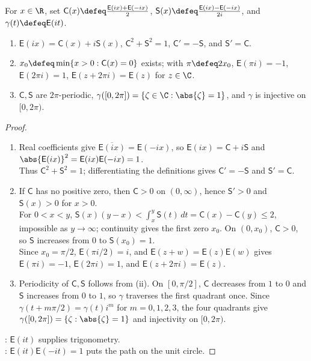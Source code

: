 \begin{theorem} \label{thm:trigonometric-functions-from-exponential} \\
For $x\in\R$, set $\mathsf{C}(x)\defeq\frac{\mathsf{E}(ix)+\mathsf{E}(-ix)}{2}$, $\mathsf{S}(x)\defeq\frac{\mathsf{E}(ix)-\mathsf{E}(-ix)}{2i}$, and $\gamma(t)\defeq\mathsf{E}(it)$.
\begin{enumerate}[label=(\roman*)]
\setlength{\itemsep}{0pt}
\item $\mathsf{E}(ix)=\mathsf{C}(x)+i\mathsf{S}(x)$, $\mathsf{C}^2+\mathsf{S}^2=1$, $\mathsf{C}'=-\mathsf{S}$, and $\mathsf{S}'=\mathsf{C}$.
\item $x_0\defeq\min\{x>0:\mathsf{C}(x)=0\}$ exists; with $\pi\defeq2x_0$, $\mathsf{E}(\pi i)=-1$, $\mathsf{E}(2\pi i)=1$, $\mathsf{E}(z+2\pi i)=\mathsf{E}(z)$ for $z\in\C$.
\item $\mathsf{C},\mathsf{S}$ are $2\pi$-periodic, $\gamma([0,2\pi])=\{\zeta\in\C:\abs{\zeta}=1\}$, and $\gamma$ is injective on $[0,2\pi)$.
\end{enumerate}
\begin{proof}
\begin{enumerate}[label=(\roman*)]
\setlength{\itemsep}{0pt}
\item Real coefficients give $\overline{\mathsf{E}(ix)}=\mathsf{E}(-ix)$, so $\mathsf{E}(ix)=\mathsf{C}+i\mathsf{S}$ and $\abs{\mathsf{E}(ix)}^2=\mathsf{E}(ix)\mathsf{E}(-ix)=1$.\\
Thus $\mathsf{C}^2+\mathsf{S}^2=1$; differentiating the definitions gives $\mathsf{C}'=-\mathsf{S}$ and $\mathsf{S}'=\mathsf{C}$.
\item If $\mathsf{C}$ has no positive zero, then $\mathsf{C}>0$ on $(0,\infty)$, hence $\mathsf{S}'>0$ and $\mathsf{S}(x)>0$ for $x>0$.\\
For $0<x<y$, $\mathsf{S}(x)(y-x)<\int_x^y\mathsf{S}(t)\,dt=\mathsf{C}(x)-\mathsf{C}(y)\leq2$, impossible as $y\to\infty$; continuity gives the first zero $x_0$. On $(0,x_0)$, $\mathsf{C}>0$, so $\mathsf{S}$ increases from $0$ to $\mathsf{S}(x_0)=1$.\\
Since $x_0=\pi/2$, $\mathsf{E}(\pi i/2)=i$, and $\mathsf{E}(z+w)=\mathsf{E}(z)\mathsf{E}(w)$ gives $\mathsf{E}(\pi i)=-1$, $\mathsf{E}(2\pi i)=1$, and $\mathsf{E}(z+2\pi i)=\mathsf{E}(z)$.
\item Periodicity of $\mathsf{C},\mathsf{S}$ follows from (ii). On $[0,\pi/2]$, $\mathsf{C}$ decreases from $1$ to $0$ and $\mathsf{S}$ increases from $0$ to $1$, so $\gamma$ traverses the first quadrant once. Since $\gamma(t+m\pi/2)=\gamma(t)i^m$ for $m=0,1,2,3$, the four quadrants give $\gamma([0,2\pi])=\{\zeta:\abs{\zeta}=1\}$ and injectivity on $[0,2\pi)$.
\end{enumerate}
: $\mathsf{E}(it)$ supplies trigonometry.\\
: $\mathsf{E}(it)\mathsf{E}(-it)=1$ puts the path on the unit circle.
\end{proof}
\end{theorem}

